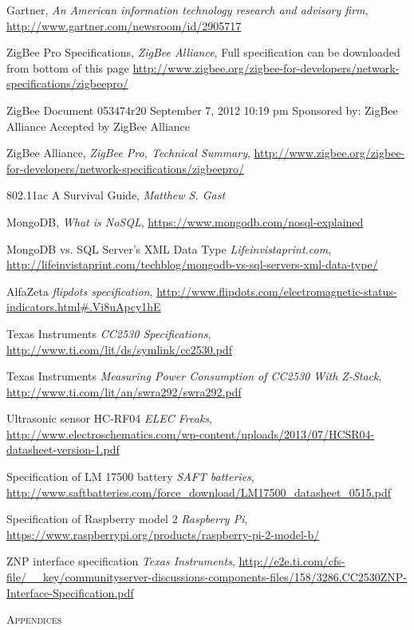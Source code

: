\documentclass[a4paper,12pt,english]{article}
\begin{document}
\begin{thebibliography}{9}


  Gartner,
  \emph{ An American information technology research and advisory
  firm}, \url{http://www.gartner.com/newsroom/id/2905717}

ZigBee Pro Specifications,
\emph{ZigBee Alliance},
Full specification can
be downloaded from
bottom of this page
\url{http://www.zigbee.org/zigbee-for-developers/network-specifications/zigbeepro/}

ZigBee Document 053474r20
September 7, 2012 10:19 pm
Sponsored by: ZigBee Alliance
Accepted by ZigBee Alliance

ZigBee Alliance,
\emph{ZigBee Pro, Technical Summary},
\url{http://www.zigbee.org/zigbee-for-developers/network-specifications/zigbeepro/}

802.11ac A Survival Guide,
\emph{Matthew S. Gast}


MongoDB,
\emph{What is NoSQL},
\url{https://www.mongodb.com/nosql-explained}


MongoDB vs. SQL Server’s XML Data Type
\emph{Lifeinvistaprint.com},
\url{http://lifeinvistaprint.com/techblog/mongodb-vs-sql-servers-xml-data-type/}

AlfaZeta
\emph{flipdots specification},
\url{http://www.flipdots.com/electromagnetic-status-indicators.html#.Vi8uApcy1hE}

Texas Instruments
\emph{CC2530 Specifications},
\url{http://www.ti.com/lit/ds/symlink/cc2530.pdf}

Texas Instruments
\emph{Measuring Power Consumption of CC2530 With Z-Stack},
\url{http://www.ti.com/lit/an/swra292/swra292.pdf}

Ultrasonic sensor HC-RF04
\emph{ELEC Freaks},
\url{http://www.electroschematics.com/wp-content/uploads/2013/07/HCSR04-datasheet-version-1.pdf}

Specification of LM 17500 battery
\emph{SAFT batteries},
\url{http://www.saftbatteries.com/force_download/LM17500_datasheet_0515.pdf}

Specification of Raspberry model 2
\emph{Raspberry Pi},
\url{https://www.raspberrypi.org/products/raspberry-pi-2-model-b/}

ZNP interface specification
\emph{Texas Instruments},
\url{http://e2e.ti.com/cfs-file/__key/communityserver-discussions-components-files/158/3286.CC2530ZNP-Interface-Specification.pdf}


\end{thebibliography}


\clearpage
\textsc{\huge Appendices}
\appendix
\end{document}

